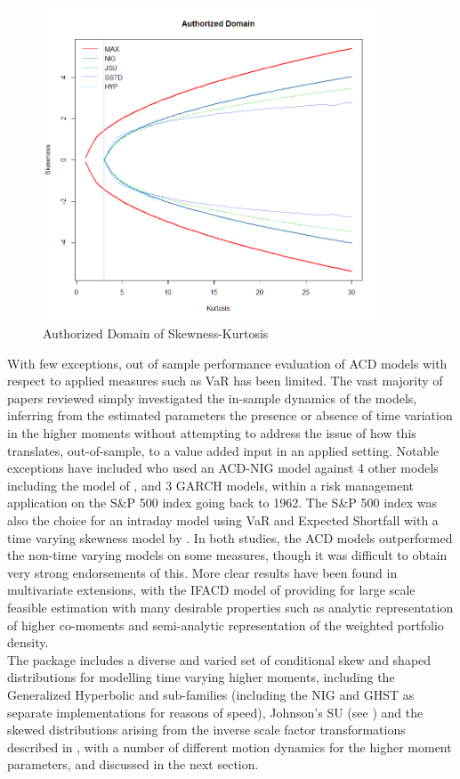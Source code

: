 \begin{figure}[!ht]
\centering
\includegraphics[width=10cm]{skdomain.png}
\caption[Authorized Domain of Skewness-Kurtosis]{Authorized Domain of Skewness-Kurtosis}\label{fig:skdomain}
\end{figure}
With few exceptions, out of sample performance evaluation of ACD models with respect to applied measures such as VaR has been limited. The vast majority of
papers reviewed simply investigated the in-sample dynamics of the models, inferring from the estimated parameters the presence or absence of time variation
in the higher moments without attempting to address the issue of how this translates, out-of-sample, to a value added input in an applied setting. Notable
exceptions have included \citet{Wilhelmsson2009} who used an ACD-NIG model against 4 other models including the model of \citet{Hansen1994}, and 3 GARCH models,
within a risk management application on the S\&P 500 index going back to 1962. The S\&P 500 index was also the choice for an intraday model using VaR and
Expected Shortfall with a time varying skewness model by \citet{Ergun2010a}. In both studies, the ACD models outperformed the non-time varying models on
some measures, though it was difficult to obtain very strong endorsements of this. More clear results have been found in multivariate extensions, with the
IFACD model of \citet{Ghalanos2013} providing for large scale feasible estimation with many desirable properties such as analytic representation of
higher co-moments and semi-analytic representation of the weighted portfolio density.\\
The \verb@racd@ package includes a diverse and varied set of conditional skew and shaped distributions for modelling time varying higher moments, including
the Generalized Hyperbolic and sub-families (including the NIG and GHST as separate implementations for reasons of speed), Johnson's SU (see \citet{Johnson1949})
and the skewed distributions arising from the inverse scale factor transformations described in \citet{Fernandez1998}, with a number of different motion dynamics
for the higher moment parameters, and discussed in the next section.
